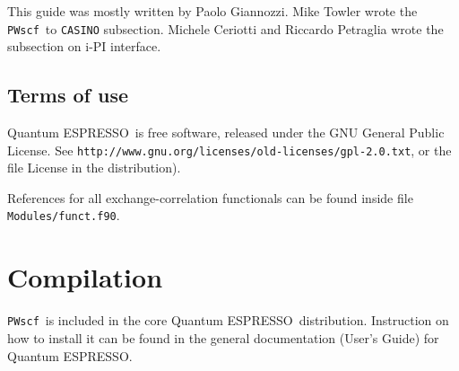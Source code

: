 \documentclass[12pt,a4paper]{article}
\def\PWscf{\texttt{PWscf}}
\def\qe{{\sc Quantum ESPRESSO}}
\begin{document}


This guide was mostly written by Paolo Giannozzi.
Mike Towler wrote the \PWscf\ to \texttt{CASINO} subsection.
Michele Ceriotti and Riccardo Petraglia wrote the subsection on i-PI
interface.

 \subsection{Terms of use}

\qe\ is free software, released under the 
GNU General Public License. See
\texttt{http://www.gnu.org/licenses/old-licenses/gpl-2.0.txt}, 
or the file License in the distribution).
    


References for all exchange-correlation functionals can be found inside
file \texttt{Modules/funct.f90}.

\section{Compilation}

\PWscf\ is included in the core \qe\ distribution.
Instruction on how to install it can be found in the
general documentation (User's Guide) for \qe.
\end{document}

